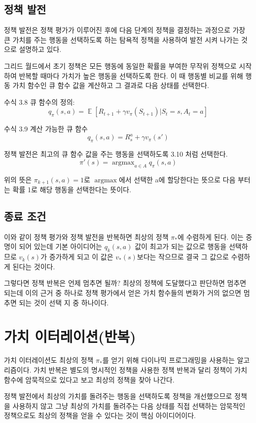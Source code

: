 \documentclass[ %
    a4paper,    %
    amsmath,    %
    itemph,     %
]{oblivoir}     %
\DeclareMathOperator*{\argmax}{argmax}
\DeclareMathOperator{\E}{\mathbb{E}}
\begin{document}
\subsection{정책 발전}

정책 발전은 정책 평가가 이루어진 후에 다음 단계의 정책을 결정하는 과정으로 가장 큰 가치를 
주는 행동을 선택하도록 하는 탐욕적 정책을 사용하여 발전 시켜 나가는 것으로 설명하고 있다. 

그리드 월드에서 초기 정책은 모든 행동에 동일한 확률을 부여한 무작위 정책으로 시작하여 
반복할 때마다 가치가 높은 행동을 선택하도록 한다. 이 때 행동별 비교를 위해 행동 가치 함수인 
큐 함수 값을 계산하고 그 결과로 다음 상태를 선택한다. 

수식 3.8 큐 함수의 정의: 
$$
q_\pi(s, a) = \E[R_{t+1} + \gamma v_\pi(S_{t+1}) | S_t = s, A_t = a ]
$$

수식 3.9 계산 가능한 큐 함수 
$$
q_\pi(s, a) = R_s^a + \gamma v_\pi(s')
$$

정책 발전은 최고의 큐 함수 값을 주는 행동을 선택하도록 3.10 처럼 선택한다. 
$$
\pi'(s) = \argmax_{a \in A} q_\pi(s, a)
$$

위의 뜻은 $\pi_{k+1}(s, a) = 1$로 $\argmax$에서 선택한 a에 할당한다는 뜻으로 
다음 부터는 확률 1로 해당 행동을 선택한다는 뜻이다. 

\subsection{종료 조건} 

이와 같이 정책 평가와 정책 발전을 반복하면 최상의 정책 $\pi_*$에 수렴하게 된다. 
이는 증명이 되어 있는데 기본 아이디어는 $q_k(s, a)$ 값이 최고가 되는 값으로 
행동을 선택하므로 $v_k(s)$가 증가하게 되고 이 값은 $v_*(s)$보다는 작으므로 
결국 그 값으로 수렴하게 된다는 것이다. 


그렇다면 정책 반복은 언제 멈추면 될까? 최상의 정책에 도달했다고 판단하면 멈추면 
되는데 이의 근거 중 하나로 정책 평가에서 얻은 가치 함수들의 변화가 거의 없으면 
멈추면 되는 것이 선택 지 중 하나이다. 

\section{가치 이터레이션(반복)}

가치 이터레이션도 최상의 정책 $\pi_*$를 얻기 위해 다이나믹 프로그래밍을 사용하는
알고리즘이다. 가치 반복은 별도의 명시적인 정책을 사용한 정책 반복과 달리 정책이 
가치 함수에 암묵적으로 있다고 보고 최상의 정책을 찾아 나간다. 

정책 발전에서 최상의 가치를 돌려주는 행동을 선택하도록 정책을 개선했으므로 
정책을 사용하지 않고 그냥 최상의 가치를 돌려주는 다음 상태를 직접 선택하는 
암묵적인 정책으로도 최상의 정책을 얻을 수 있다는 것이 핵심 아이디어이다. 
\end{document}
